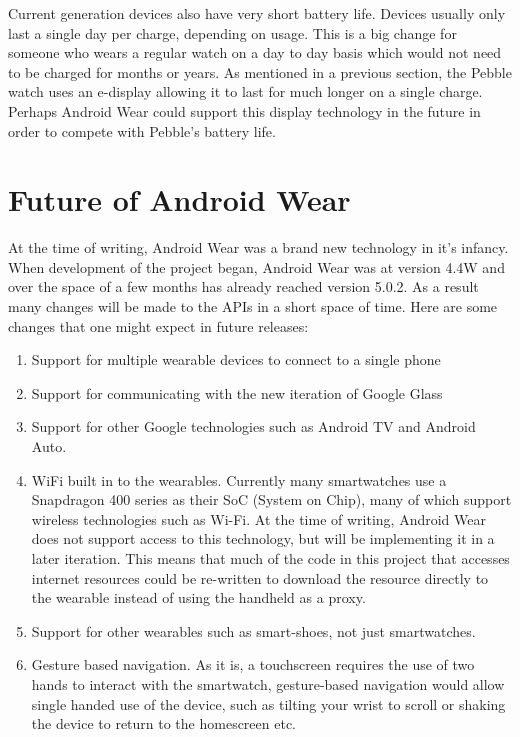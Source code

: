 Current generation devices also have very short battery life. Devices usually
only last a single day per charge, depending on usage. This is a big change for
someone who wears a regular watch on a day to day basis which would not need to
be charged for months or years. As mentioned in a previous section, the Pebble
watch uses an e-display allowing it to last for much longer on a single charge.
Perhaps Android Wear could support this display technology in the future in
order to compete with Pebble's battery life.

\section{Future of Android Wear}
At the time of writing, Android Wear was a brand new technology in it's infancy.
When development of the project began, Android Wear was at version 4.4W and over
the space of a few months has already reached version 5.0.2. As a result many
changes will be made to the APIs in a short space of time. Here are some changes
that one might expect in future releases:

\begin{enumerate}
\item Support for multiple wearable devices to connect to a single phone
\item Support for communicating with the new iteration of Google Glass
\item Support for other Google technologies such as Android TV and Android Auto.
\item WiFi built in to the wearables. Currently many smartwatches use a
    Snapdragon 400 series as their SoC (System on Chip), many of which support
    wireless technologies such as Wi-Fi. At the time of writing, Android Wear
    does not support access to this technology, but will be implementing it in
    a later iteration. This means that much of the code in this project that
    accesses internet resources could be re-written to download the resource
    directly to the wearable instead of using the handheld as a proxy.
\item Support for other wearables such as smart-shoes, not just smartwatches.
\item Gesture based navigation. As it is, a touchscreen requires the use of two
    hands to interact with the smartwatch, gesture-based navigation would allow
    single handed use of the device, such as tilting your wrist to scroll or
    shaking the device to return to the homescreen etc.
\end{enumerate}

